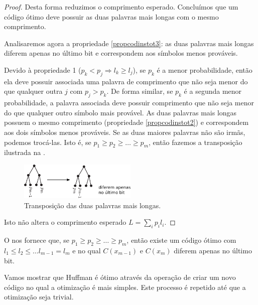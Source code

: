 \begin{proof}
Desta forma reduzimos o comprimento esperado. Concluímos que um código ótimo deve possuir as duas
palavras mais longas com o mesmo comprimento.

Analisaremos agora a propriedade \ref{propcodinstot3}: as duas palavras mais longas diferem apenas no último bit e correspondem aos símbolos menos prováveis.

Devido à propriedade 1 ($p_k < p_j \Rightarrow l_k \geq l_j$), se $p_k$ é a menor probabilidade, então ela deve
possuir associada uma palavra de comprimento que não seja menor do que qualquer outra $j$ com $p_j > p_k$.
De forma similar, se $p_k$ é a segunda menor probabilidade, a palavra associada deve possuir comprimento que não seja
menor do que qualquer outro símbolo mais provável.
As duas palavras mais longas possuem o mesmo comprimento (propriedade \ref{propcodinstot2}) e
correspondem aos dois símbolos menos prováveis.
Se as duas maiores palavras não são irmãs, podemos trocá-las. Isto é, se $p_1 \geq p_2 \geq \ldots \geq p_m$, então
fazemos a transposição ilustrada na .

\begin{figure}[h!]
\centering
\includegraphics[width=0.5\textwidth]{figures/lemmahuffman2.pdf}
\caption{Transposição das duas palavras mais longas.}\label{fig:lemmahuffman2}
\end{figure}

Isto não altera o comprimento esperado $L = \sum_i p_i l_i$.
\end{proof}



O  nos fornece que, se $p_1 \geq p_2 \geq \ldots \geq p_m$, 
então existe um código ótimo com $l_1 \leq l_2 \leq \ldots l_{m-1} = l_m$
e no qual $C(x_{m-1})$ e $C(x_m)$ diferem apenas no último bit.

Vamos mostrar que Huffman é ótimo através da operação de criar um novo código no qual a otimização é mais simples.
Este processo é repetido até que a otimização seja trivial.

